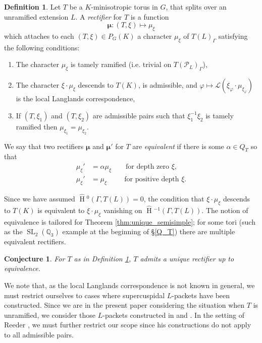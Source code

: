 \documentclass{amsart}
\theoremstyle{plain}
\newtheorem{conjecture}[theorem]{Conjecture}
\newcommand{\HT}[1]{\hat{\HH}{}^{#1}}
\theoremstyle{definition}
\newtheorem{definition}[theorem]{Definition}
\numberwithin{equation}{section}
\DeclareMathOperator{\HH}{H}
\DeclareMathOperator{\SL}{SL}
\newcommand{\PL}{\mathcal{P}_L}
\newcommand{\Lpack}{\mathcal{L}}
\newcommand{\bmu}{\boldsymbol\mu}
\begin{document}
\begin{definition} \label{def:rectifier}
  Let $T$ be a $K$-minisotropic torus in $G$, that splits over an unramified
  extension $L$.  A \emph{rectifier} for $T$ is a function
  $$\bmu : (T, \xi) \mapsto \mu_{\xi}$$
  which attaches to each $(T, \xi) \in P_G(K)$ a character
  $\mu_{\xi}$ of $T(L)_{\Gamma}$ satisfying the following conditions:

\begin{enumerate}
\item The character $\mu_{\xi}$ is tamely ramified (i.e. trivial on
  $T(\PL)_{\Gamma}$),

\item The character $\xi \cdot \mu_{\xi}$ descends to $T(K)$, is admissible,
and $\varphi \mapsto \Lpack(\xi_{\varphi} \cdot \mu_{\xi_{\varphi}})$
  is the local Langlands correspondence,

\item If $(T, \xi_1)$ and $(T, \xi_2)$ are admissible pairs such that
$\xi_1^{-1} \xi_2$ is tamely ramified then
$\mu_{\xi_1} = \mu_{\xi_2}$.
\end{enumerate}
We say that two rectifiers $\bmu$ and $\bmu'$ for $T$ are \emph{equivalent}
if there is some $\alpha \in Q_T$ so that
\begin{align*}
\mu_\xi' &= \alpha \mu_\xi \qquad \mbox{for depth zero $\xi$,} \\
\mu_\xi' &= \mu_\xi \qquad\ \  \mbox{for positive depth $\xi$.}
\end{align*}

\end{definition}

Since we have assumed $\HT{0}(\Gamma,T(L)) = 0$, the condition that $\xi \cdot \mu_\xi$
descends to $T(K)$ is equivalent to $\xi \cdot \mu_\xi$ vanishing on $\HT{-1}(\Gamma, T(L))$.  The
notion of equivalence is tailored for Theorem \ref{thm:unique_semisimple}; for some tori (such as the
$\SL_2(\mathbb{Q}_3)$ example at the beginning of \S \ref{Q_T}) there are
multiple equivalent rectifiers.

\begin{conjecture} \label{conj:unique_rectifier}
For $T$ as in Definition \ref{def:rectifier}, $T$ admits a unique rectifier up to equivalence.
\end{conjecture}

We note that, as the local Langlands correspondence is not known in general, we must restrict
ourselves to cases where supercuspidal $L$-packets have been constructed.
Since we are in the present paper considering the situation when $T$ is unramified,
we consider those $L$-packets constructed in \cite{reeder-debacker:09a} and \cite{reeder:08a}.
In the setting of Reeder \cite{reeder:08a},
we must further restrict our scope since his constructions do not apply to all admissible pairs.
\end{document}
